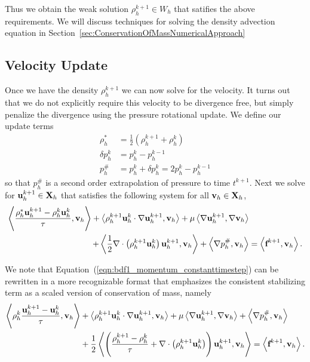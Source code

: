 \documentclass[letterpaper]{erdc}
\begin{document}
Thus we obtain the weak solution $\rho_h^{k+1}\in W_h$ that satifies the above requirements.  We will discuss techniques for solving the density advection equation in Section~\ref{sec:ConservationOfMassNumericalApproach}

%
\subsection{Velocity Update}
Once we have the density $\rho_h^{k+1}$ we can now solve for the velocity.  It turns out that we do not explicitly require this velocity to be divergence free, but simply penalize the divergence using the pressure rotational update.  We define our update terms
\begin{align*}
  \rho_h^{*} &= \frac{1}{2}\left( \rho_h^{k+1} + \rho_h^{k} \right)\\
  \delta p_h^{k} &= p_h^{k} - p_h^{k-1}\\
    p_h^{\#} &= p_h^{k} + \delta p_h^{k} = 2p_h^{k} - p_h^{k-1}
\end{align*}
so that $p_h^{\#}$ is a second order extrapolation of pressure to time $t^{k+1}$.  Next we  solve for $\textbf{u}_h^{k+1}\in\textbf{X}_h$ that satisfies the following system for all $\textbf{v}_h\in\textbf{X}_h$,
\begin{equation}\label{eqn:bdf1_momentum_constanttimestep}
  \begin{split}
\left\langle  \frac{\rho_h^{*}\textbf{u}_h^{k+1}-\rho_h^{k}\textbf{u}_h^{k} }{\tau} , \textbf{v}_h \right\rangle + \left\langle  \rho_h^{k+1}\textbf{u}_h^{k}\cdot\nabla\textbf{u}_h^{k+1} , \textbf{v}_h \right\rangle+ \mu\left\langle  \nabla \textbf{u}_h^{k+1} , \nabla\textbf{v}_h \right\rangle&\\
 + \left\langle  \frac{1}{2}\nabla\cdot\left(\rho_h^{k+1}\textbf{u}_h^{k}\right)\textbf{u}_h^{k+1} , \textbf{v}_h \right\rangle +\left\langle \nabla p_h^{\#}, \textbf{v}_h \right\rangle &= \left\langle \textbf{f}^{k+1}, \textbf{v}_h \right\rangle.
\end{split}
\end{equation}

We note that Equation~(\ref{eqn:bdf1_momentum_constanttimestep}) can be rewritten in a more recognizable format that emphasizes the consistent stabilizing term as a scaled version of conservation of mass, namely
\begin{equation}
  \begin{split}
\left\langle \rho_h^{k} \frac{\textbf{u}_h^{k+1}-\textbf{u}_h^{k} }{\tau} , \textbf{v}_h \right\rangle &+ \left\langle  \rho_h^{k+1}\textbf{u}_h^{k}\cdot\nabla\textbf{u}_h^{k+1} , \textbf{v}_h \right\rangle + \mu\left\langle  \nabla \textbf{u}_h^{k+1} , \nabla\textbf{v}_h \right\rangle+\left\langle \nabla p_h^{\#}, \textbf{v}_h \right\rangle\\
 &+ \frac{1}{2}\left\langle  \left(\frac{\rho_h^{k+1} - \rho_h^{k}}{\tau} + \nabla\cdot\left(\rho_h^{k+1}\textbf{u}_h^{k}\right)  \right )\textbf{u}_h^{k+1} , \textbf{v}_h \right\rangle = \left\langle \textbf{f}^{k+1}, \textbf{v}_h \right\rangle.
\end{split}
\end{equation}
\end{document}
